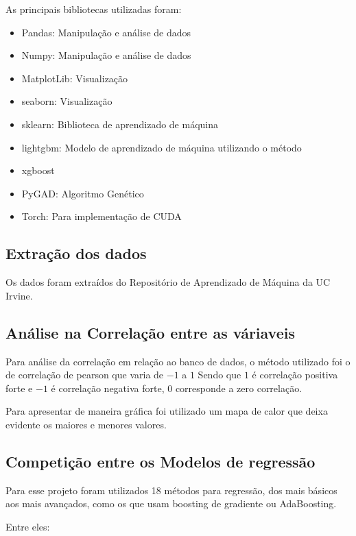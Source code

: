 \documentclass[journal]{IEEEtran}
\begin{document}
As principais bibliotecas utilizadas foram:
\begin{itemize}
    \item Pandas: Manipulação e análise de dados
    \item Numpy: Manipulação e análise de dados
    \item MatplotLib: Visualização
    \item seaborn: Visualização
    \item sklearn: Biblioteca de aprendizado de máquina
    \item lightgbm: Modelo de aprendizado de máquina utilizando o método
    \item xgboost
    \item PyGAD: Algoritmo Genético
    \item Torch: Para implementação de CUDA
\end{itemize}

\subsection{Extração dos dados}

Os dados foram extraídos do Repositório de Aprendizado de Máquina da UC Irvine.

\subsection{Análise na Correlação entre as váriaveis}

Para análise da correlação em relação ao banco de dados, o método utilizado foi o de correlação de pearson que varia de $-1$ a $1$ Sendo que $1$ é correlação positiva forte e $-1$ é correlação negativa forte, $0$ corresponde a zero correlação.

Para apresentar de maneira gráfica foi utilizado um mapa de calor que deixa evidente os maiores e menores valores.


\subsection{Competição entre os Modelos de regressão}

Para esse projeto foram utilizados 18 métodos para regressão, dos mais básicos aos mais avançados, como os que usam boosting de gradiente ou AdaBoosting.

Entre eles:
\end{document}
